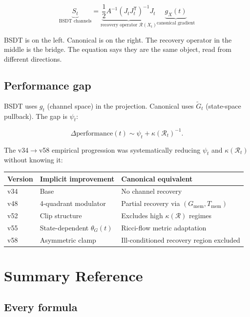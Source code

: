 \documentclass[11pt,a4paper]{article}
\theoremstyle{definition}
\newcommand{\T}{^{\mathsf{T}}}
\newcommand{\gX}{g_X}
\begin{document}
\[
\underbrace{S_t}_{\text{BSDT channels}}
=
\underbrace{\frac{1}{2}A^{-1}(J_tJ_t\T)^{-1}J_t}_{\text{recovery operator }\mathcal{R}(X_t)}
\underbrace{\gX(t)}_{\text{canonical gradient}}
\]

BSDT is on the left. Canonical is on the right.
The recovery operator in the middle is the bridge.
The equation says they are the same object, read from different directions.

\subsection{Performance gap}

BSDT uses $g_t$ (channel space) in the projection.
Canonical uses $\tilde G_t$ (state-space pullback).
The gap is $\psi_t$:

\[
\Delta\text{performance}(t) \sim \psi_t + \kappa(\mathcal{R}_t)^{-1}.
\]

The v34$\to$v58 empirical progression was systematically reducing $\psi_t$
and $\kappa(\mathcal{R}_t)$ without knowing it:

\begin{center}
\begin{tabular}{lll}
\toprule
Version & Implicit improvement & Canonical equivalent \\
\midrule
v34 & Base & No channel recovery \\
v48 & 4-quadrant modulator & Partial recovery via $(G_\mathrm{mem},T_\mathrm{mem})$ \\
v52 & Clip structure & Excludes high $\kappa(\mathcal{R})$ regimes \\
v55 & State-dependent $\theta_G(t)$ & Ricci-flow metric adaptation \\
v58 & Asymmetric clamp & Ill-conditioned recovery region excluded \\
\bottomrule
\end{tabular}
\end{center}

\section{Summary Reference}

\subsection{Every formula}
\end{document}
